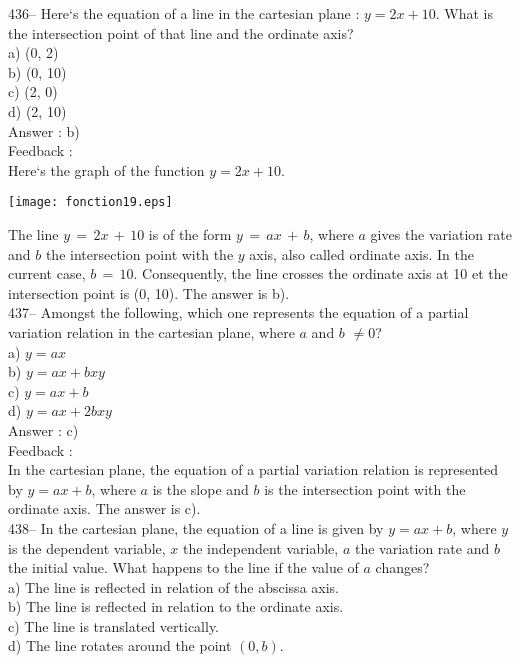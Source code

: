 ﻿\documentclass[letterpaper, 12pt]{article}
\begin{document}
436-- Here`s the equation of a line in the cartesian plane : $y=2x+10$.
What is the intersection point of that line and the ordinate axis?\\
a) (0, 2)\\
b) (0, 10)\\
c) (2, 0)\\
d) (2, 10)\\

Answer :  b)\\

Feedback : \\
Here`s the graph of the function $y=2x+10$.\\
    \begin{center}
    \texttt{[image: fonction19.eps]}
    \end{center}

The line $y\,=\,2x\,+\,10$ is of the form $y\,=\,ax\,+\,b$, where
$a$ gives the variation rate and $b$ the intersection point with the $y$ axis, also called ordinate axis.
In the current case, $b\,=\,10$.  Consequently, the line crosses the ordinate axis at 10 et the intersection point is
(0, 10). The answer is
b).\\

437-- Amongst the following, which one represents the equation of a partial variation relation in the cartesian plane, where $a$ and
$b$ $\neq0$?\\
a) $y=ax$\\
b) $y=ax+bxy$\\
c) $y=ax+b$\\
d) $y=ax+2bxy$\\


Answer : c)\\

Feedback : \\
In the cartesian plane, the equation of a partial variation relation is represented by $y=ax+b$, where $a$ is the slope and $b$ is the intersection point with the ordinate axis.  The answer is c).\\

438-- In the cartesian plane, the equation of a line is given by $y=ax+b$, where $y$ is the dependent variable, $x$ the independent variable, $a$ the variation rate and $b$ the initial value.
What happens to the line if the value of $a$ changes?\\
a) The line is reflected in relation of the abscissa axis.\\
b) The line is reflected in relation to the ordinate axis.\\
c) The line is translated vertically.\\
d) The line rotates around the point $(0,b)$.\\
\end{document}
